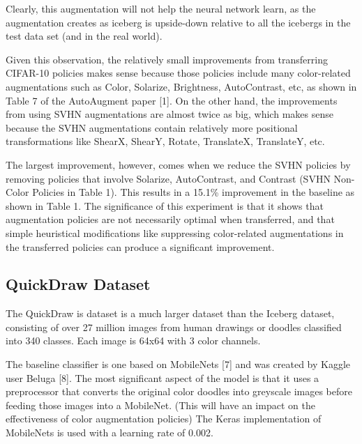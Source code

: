\documentclass[10pt,twocolumn,letterpaper]{article}
\begin{document}
Clearly, this augmentation will not help the neural network learn, as the augmentation creates as iceberg is upside-down relative to all the icebergs in the test data set (and in the real world).

Given this observation, the relatively small improvements from transferring CIFAR-10 policies makes sense because those policies include many color-related augmentations such as Color, Solarize, Brightness, AutoContrast, etc, as shown in Table 7 of the AutoAugment paper [1].  On the other hand, the improvements from using SVHN augmentations are almost twice as big, which makes sense because the SVHN augmentations contain relatively more positional transformations like ShearX, ShearY, Rotate, TranslateX, TranslateY, etc.

The largest improvement, however, comes when we reduce the SVHN policies by removing policies that involve Solarize, AutoContrast, and Contrast (SVHN Non-Color Policies in Table 1).  This results in a 15.1\% improvement in the baseline as shown in Table 1.  The significance of this experiment is that it shows that augmentation policies are not necessarily optimal when transferred, and that simple heuristical modifications like suppressing color-related augmentations in the transferred policies can produce a significant improvement.


\subsection{QuickDraw Dataset}

The QuickDraw is dataset is a much larger dataset than the Iceberg dataset, consisting of over 27 million images from human drawings or doodles classified into 340 classes.  Each image is 64x64 with 3 color channels.  

The baseline classifier is one based on MobileNets [7] and was created by Kaggle user Beluga [8].  The most significant aspect of the model is that it uses a preprocessor that converts the original color doodles into greyscale images before feeding those images into a MobileNet.  (This will have an impact on the effectiveness of color augmentation policies)  The Keras implementation of MobileNets is used with a learning rate of 0.002.
\end{document}
